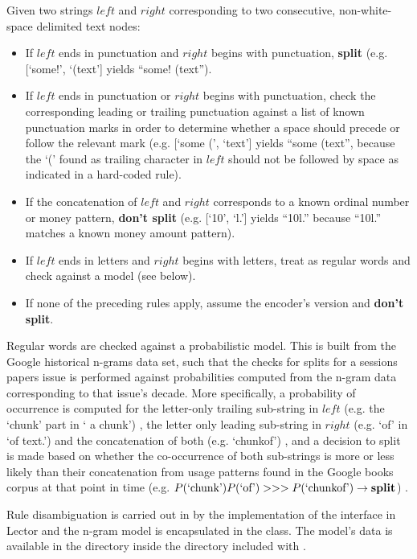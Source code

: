 Given two strings ${left}$ and ${right}$ corresponding to two consecutive, non-white-space delimited text nodes:
\begin{itemize}
    \item If ${left}$ ends in punctuation and ${right}$ begins with punctuation, \textbf{split} (e.g. [`some!', `(text'] yields ``some! (text'').
    \item If ${left}$ ends in punctuation or ${right}$ begins with punctuation, check the corresponding leading or trailing punctuation against a list of known punctuation marks in order to determine whether a space should precede or follow the relevant mark (e.g. [`some (', `text'] yields ``some (text'', because the `(' found as trailing character in ${left}$ should not be followed by space as indicated in a hard-coded rule).
    \item If the concatenation of ${left}$ and ${right}$ corresponds to a known ordinal number or money pattern, \textbf{don't split} (e.g. [`10', `l.'] yields ``10l.'' because ``10l.'' matches a known money amount pattern).
    \item If ${left}$ ends in letters and ${right}$ begins with letters, treat as regular words and check against a model (see below).
    \item If none of the preceding rules apply, assume the encoder's version and \textbf{don't split}.
\end{itemize}

Regular words are checked against a probabilistic model.
This is built from the Google historical n-grams data set, such that the checks for splits for a sessions papers issue is performed against probabilities computed from the n-gram data corresponding to that issue's decade.
More specifically, a probability of occurrence is computed for the letter-only trailing sub-string in ${left}$
    (e.g. the `chunk' part in ` a chunk')
, the letter only leading sub-string in ${right}$
    (e.g. `of' in `of text.')
and the concatenation of both
    (e.g. `chunkof')
, and a decision to split is made based on whether the co-occurrence of both sub-strings is more or less likely than their concatenation from usage patterns found in the Google books corpus at that point in time
    (e.g. $P( \text{`chunk'} )P( \text{`of'} ) >>> P( \text{`chunkof'} ) \rightarrow \text{\textbf{split}}$)
.

Rule disambiguation is carried out in  by the  implementation of the  interface in Lector and the n-gram model is encapsulated in the  class.
The model's data is available in the  directory inside the  directory included with .

